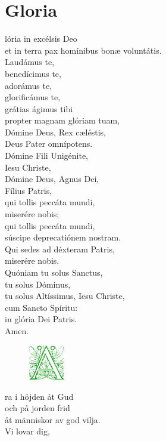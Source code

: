 \section*{Gloria}
\begin{multicols}{2}
\renewcommand{\columnseprulecolor}{\color{rubrica}}
\renewcommand{\columnseprule}{0.4pt}


lória in excélsis Deo\\
et in terra pax homínibus
bonæ voluntátis.\\
Laudámus te,\\
benedícimus te,\\
adorámus te,\\
glorificámus te,\\
grátias ágimus tibi\\
propter magnam glóriam tuam,\\
Dómine Deus, Rex cæléstis,\\
Deus Pater omnípotens.\\
Dómine Fili Unigénite,\\
Iesu Christe,\\
Dómine Deus, Agnus Dei,\\
Fílius Patris,\\
qui tollis peccáta mundi,\\
miserére nobis;\\
qui tollis peccáta mundi,\\
súscipe deprecatiónem nostram.\\
Qui sedes ad déxteram Patris,\\
miserére nobis.\\
Quóniam tu solus Sanctus,\\
tu solus Dóminus,\\
tu solus Altíssimus, Iesu Christe,\\
cum Sancto Spíritu:\\
in glória Dei Patris.\\
Amen.

\columnbreak
\begin{figure}
\includegraphics[width=1.6cm]{./imag/acorn1.png}
\end{figure}ra i höjden åt Gud\\
och på jorden frid\\
åt människor av god vilja.\\
{\color{micolor}Vi lovar dig, }\\


\end{multicols}
